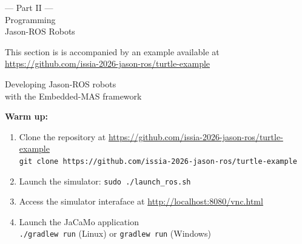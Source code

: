 \documentclass[compress]{beamer}
\begin{document}
\begin{frame}
 
 \HUGE
\centering
--- Part II ---\\
Programming\\
Jason-ROS Robots\\
 
 \vspace{3em}
 
\scriptsize 
This section is is accompanied by an example available at \url{https://github.com/issia-2026-jason-ros/turtle-example}
 
 
\end{frame}


\begin{frame}[fragile]{Developing Jason-ROS robots\\ {\scriptsize with the Embedded-MAS framework}}
 
 {\bf Warm up:}
 \footnotesize
 \vspace{2em}
 \begin{enumerate}
  \item Clone the repository at \url{https://github.com/issia-2026-jason-ros/turtle-example}\\  
  {\tiny \texttt{git clone https://github.com/issia-2026-jason-ros/turtle-example}}
  \vspace{1em}
  \item Launch the simulator: \texttt{sudo ./launch\_ros.sh}
  \vspace{1em}
  \item Access the simulator interaface at \url{http://localhost:8080/vnc.html}
  \item Launch the JaCaMo application\\
     {\tiny \texttt{./gradlew run} (Linux) or \texttt{gradlew run} (Windows)}
  
  
  
 \end{enumerate}

\end{frame}
\end{document}
